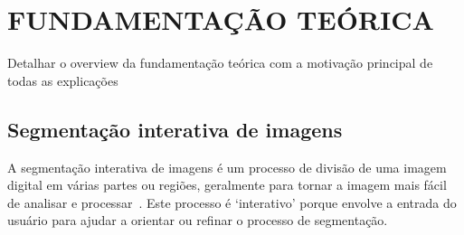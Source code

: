 \chapter{FUNDAMENTAÇÃO TEÓRICA}\label{cap:fundamentacao-teorica}


Detalhar o overview da fundamentação teórica com a motivação principal
de todas as explicações


\section{Segmentação interativa de imagens}\label{sec:segmentacao-interativa}

A segmentação interativa de imagens é um processo de divisão de uma
imagem digital em várias partes ou regiões, geralmente para tornar a
imagem mais fácil de analisar e processar~\cite{ramadan2020survey}. Este processo é `interativo'
porque envolve a entrada do usuário para ajudar a orientar ou refinar
o processo de segmentação.

\begin{figure}[h!]
        \captionsetup{width=12cm}
		\centering
\end{figure}
\FloatBarrier{}

